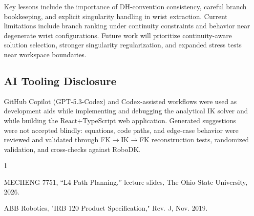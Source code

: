 \documentclass[conference]{IEEEtran}
\begin{document}
Key lessons include the importance of DH-convention consistency, careful branch bookkeeping, and explicit singularity handling in wrist extraction. Current limitations include branch ranking under continuity constraints and behavior near degenerate wrist configurations. Future work will prioritize continuity-aware solution selection, stronger singularity regularization, and expanded stress tests near workspace boundaries.

\subsection{AI Tooling Disclosure}
GitHub Copilot (GPT-5.3-Codex) and Codex-assisted workflows were used as development aids while implementing and debugging the analytical IK solver and while building the React+TypeScript web application. Generated suggestions were not accepted blindly: equations, code paths, and edge-case behavior were reviewed and validated through FK$\rightarrow$IK$\rightarrow$FK reconstruction tests, randomized validation, and cross-checks against RoboDK.

\begin{thebibliography}{1}

MECHENG 7751, ``L4 Path Planning,'' lecture slides, The Ohio State University, 2026.

ABB Robotics, "IRB 120 Product Specification," Rev. J, Nov. 2019.

\end{thebibliography}
\end{document}
